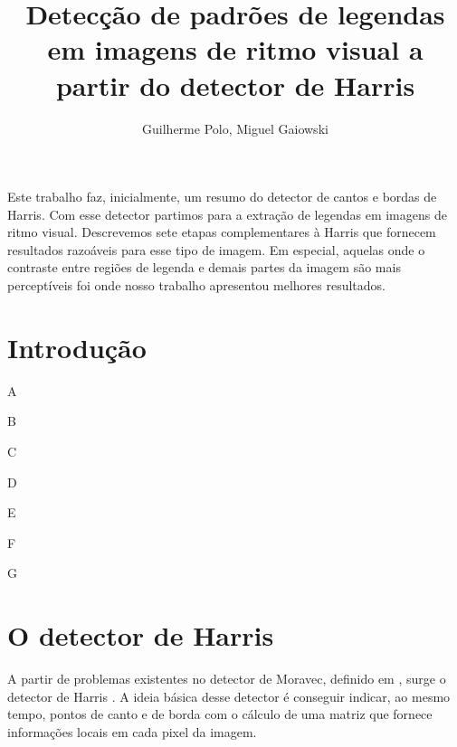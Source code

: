 \documentclass[12pt]{article}
\title{Detecção de padrões de legendas em imagens de ritmo visual a partir
do detector de Harris}
\author{Guilherme Polo\inst{1}, Miguel Gaiowski\inst{1}}
\begin{document}
\maketitle

\begin{resumo}
  Este trabalho faz,  inicialmente, um resumo do detector  de cantos e
  bordas de  Harris.  Com  esse detector partimos  para a  extração de
  legendas  em  imagens  de  ritmo visual.   Descrevemos  sete  etapas
  complementares à Harris que  fornecem resultados razoáveis para esse
  tipo de imagem. Em especial,  aquelas onde o contraste entre regiões
  de legenda e demais partes  da imagem são mais perceptíveis foi onde
  nosso trabalho apresentou melhores resultados.
\end{resumo}


\section{Introdução}

A
\cite{harris}

B

C

D

E

F

G


\section{O detector de Harris}

A partir de  problemas existentes no detector de  Moravec, definido em
\cite{moravec},  surge o  detector  de Harris  \cite{harris}. A  ideia
básica desse detector  é conseguir indicar, ao mesmo  tempo, pontos de
canto e de  borda com o cálculo de uma  matriz que fornece informações
locais em cada pixel da imagem.

\end{document}
